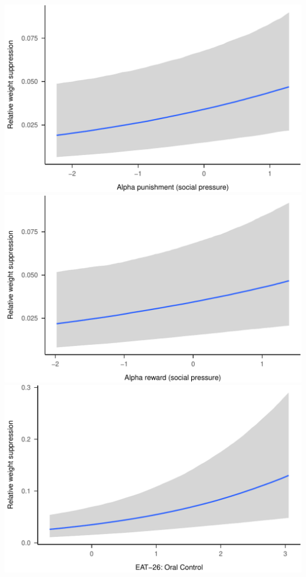 \documentclass[
]{article}
\begin{document}
\includegraphics{046_weight_history_alpha_files/figure-latex/unnamed-chunk-9-2.pdf}
\includegraphics{046_weight_history_alpha_files/figure-latex/unnamed-chunk-9-3.pdf}
\includegraphics{046_weight_history_alpha_files/figure-latex/unnamed-chunk-9-4.pdf}
\end{document}
